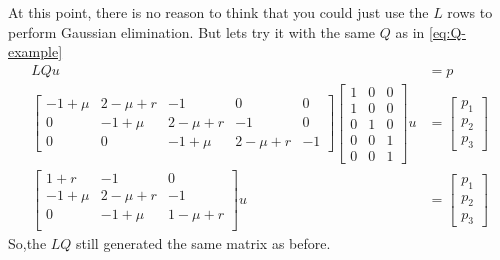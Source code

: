 \documentclass[11pt]{article}
\begin{document}
At this point, there is no reason to think that you could just use the $L$ rows to perform Gaussian elimination.  But lets try it with the same $Q$ as in \cref{eq:Q-example}
\begin{align}
L Q u &= p\\
\begin{bmatrix}
	-1 + \mu & 2 -\mu + r & -1 & 0 & 0\\
0 & -1 + \mu & 2 - \mu +r & -1 & 0\\
0 & 0 & -1 + \mu & 2 - \mu +r & -1
\end{bmatrix}\begin{bmatrix}
1 & 0 & 0\\
1 & 0 & 0\\
0 & 1& 0\\
0 & 0& 1\\
0 & 0& 1
\end{bmatrix} u &= \begin{bmatrix} p_1 \\ p_2 \\ p_3\end{bmatrix}\\
\begin{bmatrix}
1 + r & -1 & 0\\
-1 + \mu & 2 - \mu +r & -1\\
0 & -1 + \mu & 1 - \mu +r\\
\end{bmatrix} u &= \begin{bmatrix} p_1 \\ p_2 \\ p_3\end{bmatrix}
\end{align}
So,the $L Q$ still generated the same matrix as before.
\end{document}
